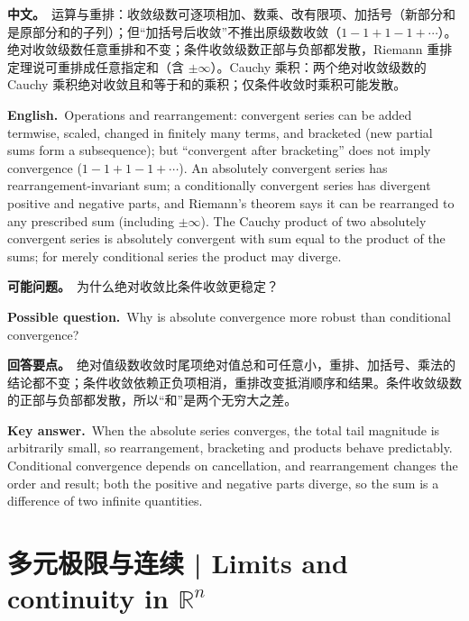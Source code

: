 \documentclass[UTF8,11pt,a4paper]{ctexart}
\newcommand{\R}{\mathbb{R}}
\newcommand{\BOTH}[2]{\par\noindent\textbf{中文。}\ #1\par\noindent\textbf{English.}\ #2\par}
\newcommand{\ASK}[4]{\begin{samepage}\par\noindent\textbf{可能问题。}\ #1\par\noindent\textbf{Possible question.}\ #2\par\noindent\textbf{回答要点。}\ #3\par\noindent\textbf{Key answer.}\ #4\medskip\end{samepage}}
\begin{document}
\BOTH{运算与重排：收敛级数可逐项相加、数乘、改有限项、加括号（新部分和是原部分和的子列）；但“加括号后收敛”不推出原级数收敛（$1-1+1-1+\cdots$）。绝对收敛级数任意重排和不变；条件收敛级数正部与负部都发散，Riemann 重排定理说可重排成任意指定和（含 $\pm\infty$）。Cauchy 乘积：两个绝对收敛级数的 Cauchy 乘积绝对收敛且和等于和的乘积；仅条件收敛时乘积可能发散。}{Operations and rearrangement: convergent series can be added termwise, scaled, changed in finitely many terms, and bracketed (new partial sums form a subsequence); but “convergent after bracketing” does not imply convergence ($1-1+1-1+\cdots$). An absolutely convergent series has rearrangement-invariant sum; a conditionally convergent series has divergent positive and negative parts, and Riemann's theorem says it can be rearranged to any prescribed sum (including $\pm\infty$). The Cauchy product of two absolutely convergent series is absolutely convergent with sum equal to the product of the sums; for merely conditional series the product may diverge.}
\ASK{为什么绝对收敛比条件收敛更稳定？}{Why is absolute convergence more robust than conditional convergence?}{绝对值级数收敛时尾项绝对值总和可任意小，重排、加括号、乘法的结论都不变；条件收敛依赖正负项相消，重排改变抵消顺序和结果。条件收敛级数的正部与负部都发散，所以“和”是两个无穷大之差。}{When the absolute series converges, the total tail magnitude is arbitrarily small, so rearrangement, bracketing and products behave predictably. Conditional convergence depends on cancellation, and rearrangement changes the order and result; both the positive and negative parts diverge, so the sum is a difference of two infinite quantities.}

\section{多元极限与连续 | Limits and continuity in \texorpdfstring{$\R^n$}{R\^{}n}}
\end{document}
